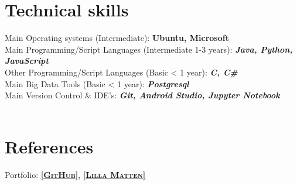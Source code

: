 \documentclass[11pt,a4paper,sans,colorlinks,linkcolor=blue,urlcolor=blue]{moderncv}
\begin{document}
\section{Technical skills}
Main Operating systems (Intermediate): \textbf{Ubuntu, Microsoft}
\\
{Main Programming/Script Languages (Intermediate 1-3 years): \textbf{\textit{Java, Python, JavaScript}}}
\\
{Other Programming/Script Languages (Basic < 1 year): \textbf{\textit{C, C\#}}}
\\
Main Big Data Tools (Basic < 1 year): 
\textbf{\textit{Postgresql}}
\\
Main Version Control \& IDE's: \textbf{\textit{Git, Android Studio, Jupyter Notebook}}
\\
\\

\section{References}
Portfolio: \underline{\href{https://github.com/jacobpihl}{\textbf{\textsc{[GitHub]}}}},
\underline{\href{https://play.google.com/store/apps/details?id=com.PihlApps.LillaMatten}{\textbf{\textsc{[Lilla Matten]}}}}\\

\end{document}
